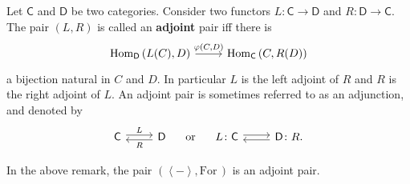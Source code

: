 \begin{defn}
	Let $\mathsf{C}$ and $\mathsf{D}$ be two categories.
	Consider two functors $L: \mathsf{C} \to \mathsf{D}$ and $R: \mathsf{D} \to \mathsf{C}$.
	The pair $\left(L, R\right)$ is called an \textbf{adjoint} pair iff there is
	\begin{equation}
	\begin{tikzcd}
		\mathrm{Hom}_{\mathsf{D}} \left( L(C), D \right) \arrow[r, "{\varphi(C,D)}", rightarrow] &
		\mathrm{Hom}_{\mathsf{C}} \left( C, R(D) \right)
	\end{tikzcd}
	\end{equation} 
	a bijection natural in $C$ and $D$.
	In particular $L$ is the left adjoint of $R$ and $R$ is the right adjoint of $L$.
	An adjoint pair is sometimes referred to as an adjunction, and denoted by
	\begin{equation}
	\begin{tikzcd}
		\mathsf{C} \arrow[r, "L", rightarrow, shift left = .5ex] &
		\mathsf{D} \arrow[l, "R", rightarrow, shift left = .5ex] 
	\end{tikzcd}
	\quad\text{ or }\quad
	\begin{tikzcd}
		L\colon\mathsf{C} \arrow[r, "", rightarrow, shift left = .5ex] &
		\mathsf{D}\colon R \arrow[l, "", rightarrow, shift left = .5ex] 
	.\end{tikzcd}
	\end{equation} 
\end{defn}

\begin{rem}
	In the above remark, the pair $\left(\left\langle - \right\rangle, \mathrm{For}\, \right)$ is an adjoint pair.
\end{rem} 

